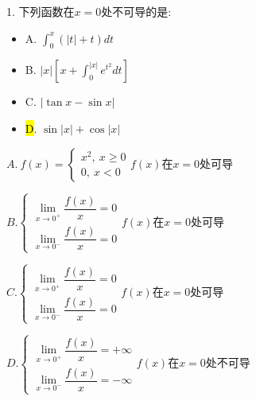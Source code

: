 1. 下列函数在$x=0$处不可导的是: 
\begin{itemize}
	\item A. $\int_{0}^{x}(|t|+t)dt$
	\item B. $|x|[x+\int_{0}^{|x|}e^{t^2}dt]$
	\item C. $|\tan x-\sin x|$
	\item \hl{D}. $\sin|x|+\cos |x|$
\end{itemize}
\begin{solution}
	
	$A.\ f(x)=\left\lbrace
	\begin{array}{l}
		x^2,\ x\geq 0\\
		0,\ x<0
	\end{array}
	\right. f(x)\text{在}x=0\text{处可导}$
	
	$B. \left\lbrace
	\begin{array}{l}
		\lim\limits_{x\rightarrow 0^{+}}\dfrac{f(x)}{x}=0\\
		\lim\limits_{x\rightarrow 0^{-}}\dfrac{f(x)}{x}=0
	\end{array}
	\right. f(x)\text{在}x=0\text{处可导}$
	
	$C. \left\lbrace
	\begin{array}{l}
		\lim\limits_{x\rightarrow 0^{+}}\dfrac{f(x)}{x}=0\\
		\lim\limits_{x\rightarrow 0^{-}}\dfrac{f(x)}{x}=0
	\end{array}
	\right. f(x)\text{在}x=0\text{处可导}$
	
	$D. \left\lbrace
	\begin{array}{l}
		\lim\limits_{x\rightarrow 0^{+}}\dfrac{f(x)}{x}=+\infty\\
		\lim\limits_{x\rightarrow 0^{-}}\dfrac{f(x)}{x}=-\infty
	\end{array}
	\right. f(x)\text{在}x=0\text{处不可导}$
\end{solution}

